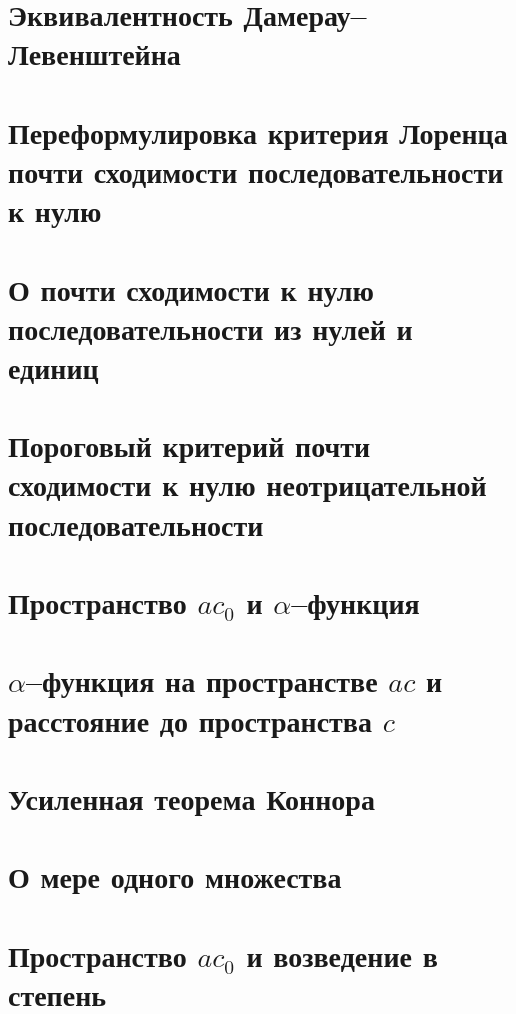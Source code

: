 \documentclass[12pt,a4paper,openbib]{report}
\theoremstyle{definition}
\begin{document}
	\section{Эквивалентность Дамерау--Левенштейна}
	

	\section{Переформулировка критерия Лоренца почти сходимости последовательности к нулю}
	

	\section{О почти сходимости к нулю последовательности из нулей и единиц}
	
	
	

	\section{Пороговый критерий почти сходимости к нулю неотрицательной последовательности}
	

	\section{Пространство $ac_0$ и $\alpha$--функция}
	

	\section{$\alpha$--функция на пространстве $ac$ и расстояние до пространства $c$}
	

	\section{Усиленная теорема Коннора}
	

	\section{О мере одного множества}
	

	\section{Пространство $ac_0$ и возведение в степень}
	
\end{document}
